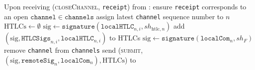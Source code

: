 \begin{algorithmic}[1]
    \State Upon receiving (\textsc{closeChannel}, \texttt{receipt}) from
    \environment:
    \Indent
      \State ensure \texttt{receipt} corresponds to an open $\mathtt{channel}
      \in \mathtt{channels}$
      \State assign latest \texttt{channel} sequence number to $n$
      \State $\mathrm{HTLCs} \gets \emptyset$
        \State $\mathrm{sig} \gets
        \mathtt{signature}\left(\mathtt{localHTLC}_{n, i}, sh_{\mathrm{htlc},
        n}\right)$
        \State add $\left(\mathrm{sig}, \mathtt{HTLCSigs}_{n, i},
        \mathtt{localHTLC}_{n, i}\right)$ to HTLCs
      \EndFor
      \State $\mathrm{sig} \gets \mathtt{signature}\left(\mathtt{localCom}_n,
      sh_F\right)$
      \State remove \texttt{channel} from \texttt{channels}
      \State send (\textsc{submit}, $\left(\mathrm{sig}, \mathtt{remoteSig}_n,
      \mathtt{localCom}_n\right), \mathrm{HTLCs}$) to \ledger
    \EndIndent
  \end{algorithmic}
\hrulefill

